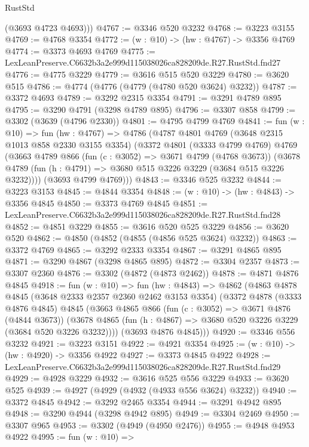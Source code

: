 \begin{lexlean}{RustStd}
\begin{coremodule}
        (@3693 @4723 @4693)))
@4767 := @3346 @520 @3232
@4768 := @3223 @3155
@4769 := @4768 @3354
@4772 := (w : @10) -> (hw : @4767) -> @3356 @4769
@4774 := @3373 @4693 @4769
@4775 := LexLeanPreserve.C6632b3a2e999d115038026ca828209de.R27.RustStd.fnd27
@4776 := @4775 @3229
@4779 := @3616 @515 @520 @3229
@4780 := @3620 @515
@4786 := @4774 (@4776 (@4779 (@4780 @520 @3624) @3232))
@4787 := @3372 @4693
@4789 := @3292 @2315 @3354
@4791 := @3291 @4789 @895
@4795 := @3290 @4791 (@3298 @4789 @895)
@4796 := @3307 @858
@4799 := @3302 (@3639 (@4796 @2330))
@4801 := @4795 @4799 @4769
@4841 := fun (w : @10) =>
  fun (hw : @4767) =>
  @4786
    (@4787
      @4801
      @4769
      (@3648 @2315 @1013 @858 @2330 @3155 @3354)
      (@3372
        @4801
        (@3333 @4799 @4769)
        @4769
        (@3663
          @4789
          @866
          (fun (c : @3052) => @3671 @4799 (@4768 @3673))
          (@3678 @4789 (fun (h : @4791) => @3680 @515 @3226 @3229 (@3684 @515 @3226 @3232))))
        (@3693 @4799 @4769)))
@4843 := @3346 @525 @3232
@4844 := @3223 @3153
@4845 := @4844 @3354
@4848 := (w : @10) -> (hw : @4843) -> @3356 @4845
@4850 := @3373 @4769 @4845
@4851 := LexLeanPreserve.C6632b3a2e999d115038026ca828209de.R27.RustStd.fnd28
@4852 := @4851 @3229
@4855 := @3616 @520 @525 @3229
@4856 := @3620 @520
@4862 := @4850 (@4852 (@4855 (@4856 @525 @3624) @3232))
@4863 := @3372 @4769
@4865 := @3292 @2333 @3354
@4867 := @3291 @4865 @895
@4871 := @3290 @4867 (@3298 @4865 @895)
@4872 := @3304 @2357
@4873 := @3307 @2360
@4876 := @3302 (@4872 (@4873 @2462))
@4878 := @4871 @4876 @4845
@4918 := fun (w : @10) =>
  fun (hw : @4843) =>
  @4862
    (@4863
      @4878
      @4845
      (@3648 @2333 @2357 @2360 @2462 @3153 @3354)
      (@3372
        @4878
        (@3333 @4876 @4845)
        @4845
        (@3663
          @4865
          @866
          (fun (c : @3052) => @3671 @4876 (@4844 @3673))
          (@3678 @4865 (fun (h : @4867) => @3680 @520 @3226 @3229 (@3684 @520 @3226 @3232))))
        (@3693 @4876 @4845)))
@4920 := @3346 @556 @3232
@4921 := @3223 @3151
@4922 := @4921 @3354
@4925 := (w : @10) -> (hw : @4920) -> @3356 @4922
@4927 := @3373 @4845 @4922
@4928 := LexLeanPreserve.C6632b3a2e999d115038026ca828209de.R27.RustStd.fnd29
@4929 := @4928 @3229
@4932 := @3616 @525 @556 @3229
@4933 := @3620 @525
@4939 := @4927 (@4929 (@4932 (@4933 @556 @3624) @3232))
@4940 := @3372 @4845
@4942 := @3292 @2465 @3354
@4944 := @3291 @4942 @895
@4948 := @3290 @4944 (@3298 @4942 @895)
@4949 := @3304 @2469
@4950 := @3307 @965
@4953 := @3302 (@4949 (@4950 @2476))
@4955 := @4948 @4953 @4922
@4995 := fun (w : @10) =>

\end{coremodule}
\end{lexlean}
